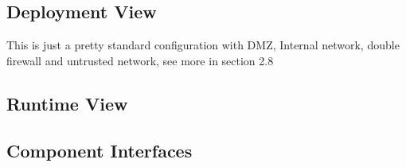 \documentclass{article}
\begin{document}
\subsection{Deployment View}
\begin{figure}[H]
\end{figure}
		This is just a pretty standard configuration with DMZ, Internal network, double firewall and untrusted network, see more in section 2.8
\subsection{Runtime View}
\subsection{Component Interfaces}
\end{document}

